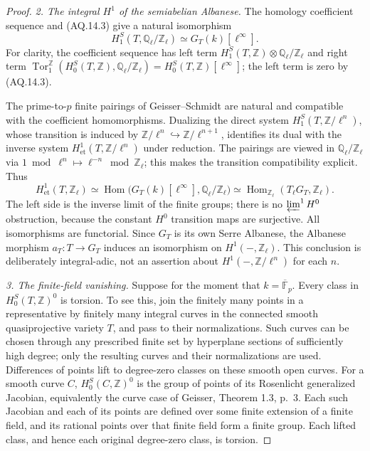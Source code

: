 \begin{proof}
\emph{2. The integral $H^1$ of the semiabelian Albanese.}
The homology coefficient sequence and (AQ.14.3) give a
natural isomorphism
\[
 H_1^S(T,\mathbb Q_\ell/\mathbb Z_\ell)
             \simeq G_T(k)[\ell^\infty].                    \tag{AQ.14.5}
\]
For clarity, the coefficient sequence has left term
$H_1^S(T,\mathbb Z)\otimes\mathbb Q_\ell/\mathbb Z_\ell$
and right term
$\operatorname{Tor}_1^{\mathbb Z}(H_0^S(T,\mathbb Z),
\mathbb Q_\ell/\mathbb Z_\ell)=H_0^S(T,\mathbb Z)[\ell^\infty]$;
the left term is zero by (AQ.14.3).

The prime-to-$p$ finite pairings of Geisser--Schmidt are
natural and compatible with the coefficient homomorphisms.
Dualizing the direct system
$H_1^S(T,\mathbb Z/\ell^n)$, whose transition is induced by
$\mathbb Z/\ell^n\hookrightarrow\mathbb Z/\ell^{n+1}$,
identifies its dual with the inverse system
$H^1_{\mathrm{et}}(T,\mathbb Z/\ell^n)$ under reduction.
The pairings are viewed in $\mathbb Q_\ell/\mathbb Z_\ell$
via $1\bmod\ell^n\mapsto\ell^{-n}\bmod\mathbb Z_\ell$;
this makes the transition compatibility explicit. Thus
\[
 H^1_{\mathrm{et}}(T,\mathbb Z_\ell)
  \simeq\operatorname{Hom}\bigl(
       G_T(k)[\ell^\infty],\mathbb Q_\ell/\mathbb Z_\ell\bigr)
  \simeq\operatorname{Hom}_{\mathbb Z_\ell}
       (T_\ell G_T,\mathbb Z_\ell).                         \tag{AQ.14.6}
\]
The left side is the inverse limit of the finite groups;
there is no $\varprojlim^1 H^0$ obstruction, because the
constant $H^0$ transition maps are surjective. All
isomorphisms are functorial. Since $G_T$ is its own Serre
Albanese, the Albanese morphism $a_T:T\to G_T$ induces an
isomorphism on $H^1(-,\mathbb Z_\ell)$. This conclusion
is deliberately integral-adic, not an assertion about
$H^1(-,\mathbb Z/\ell^n)$ for each $n$.

\emph{3. The finite-field vanishing.}
Suppose for the moment that $k=\overline{\mathbb F}_p$.
Every class in $H_0^S(T,\mathbb Z)^0$ is torsion.
To see this, join the finitely many points in a representative
by finitely many integral curves in the connected smooth
quasiprojective variety $T$, and pass to their normalizations.
Such curves can be chosen through any prescribed finite
set by hyperplane sections of sufficiently high degree;
only the resulting curves and their normalizations are
used. Differences of points lift to degree-zero classes
on these smooth open curves. For a smooth curve $C$,
$H_0^S(C,\mathbb Z)^0$ is the group of points of its
Rosenlicht generalized Jacobian, equivalently the curve
case of Geisser, Theorem 1.3, p.~3. Each such Jacobian and
each of its points are defined over some finite extension
of a finite field, and its rational points over that
finite field form a finite group. Each lifted class,
and hence each original degree-zero class, is torsion.


\end{proof}
